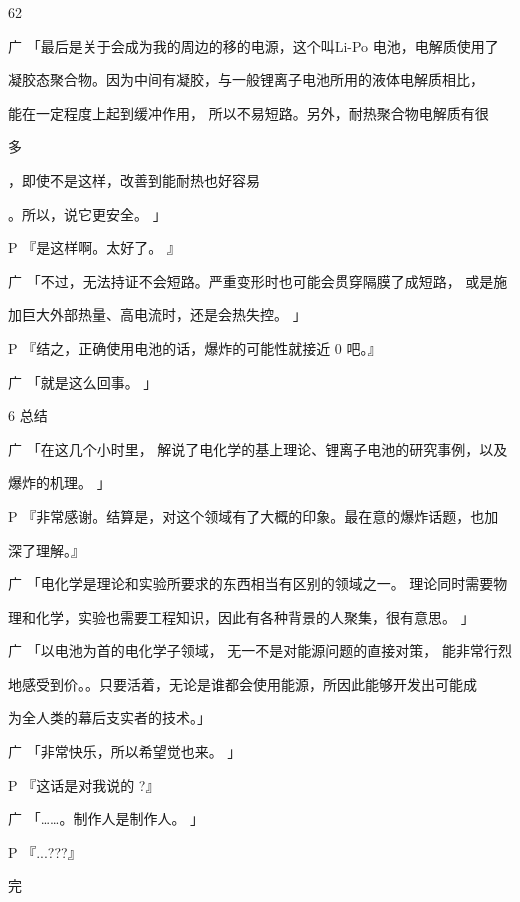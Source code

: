62\par
广 「最后是关于会成为我的周边的移的电源，这个叫Li-Po 电池，电解质使用了\par
凝胶态聚合物。因为中间有凝胶，与一般锂离子电池所用的液体电解质相比，\par
能在一定程度上起到缓冲作用， 所以不易短路。另外，耐热聚合物电解质有很\par
多\par
[16]\par
，即使不是这样，改善到能耐热也好容易\par
[17]\par
。所以，说它更安全。 」\par
P 『是这样啊。太好了。 』\par
广 「不过，无法持证不会短路。严重变形时也可能会贯穿隔膜了成短路， 或是施\par
加巨大外部热量、高电流时，还是会热失控。 」\par
P 『结之，正确使用电池的话，爆炸的可能性就接近 0 吧。』\par
广 「就是这么回事。 」\par
6 总结\par
广 「在这几个小时里， 解说了电化学的基上理论、锂离子电池的研究事例，以及\par
爆炸的机理。 」\par
P 『非常感谢。结算是，对这个领域有了大概的印象。最在意的爆炸话题，也加\par
深了理解。』\par
广 「电化学是理论和实验所要求的东西相当有区别的领域之一。 理论同时需要物\par
理和化学，实验也需要工程知识，因此有各种背景的人聚集，很有意思。 」\par
广 「以电池为首的电化学子领域， 无一不是对能源问题的直接对策， 能非常行烈\par
地感受到价。。只要活着，无论是谁都会使用能源，所因此能够开发出可能成\par
为全人类的幕后支实者的技术。」\par
广 「非常快乐，所以希望觉也来。 」\par
P 『这话是对我说的 ?』\par
广 「……。制作人是制作人。 」\par
P 『...???』\par
完\par

